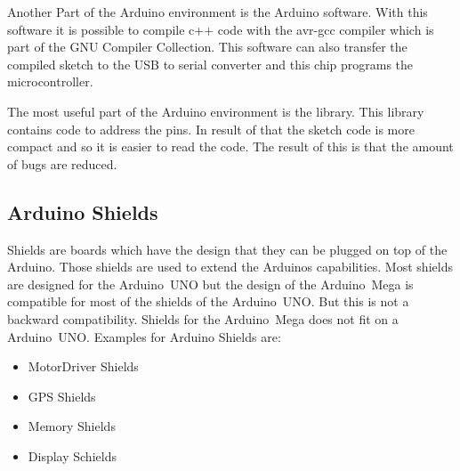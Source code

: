 Another Part of the Arduino environment is the Arduino software.
With this software it is possible to compile c++ code with the avr-gcc compiler which is part of the GNU Compiler Collection.
This software can also transfer the compiled sketch to the USB to serial converter and this chip programs the microcontroller.

The most useful part of the Arduino environment is the library.
This library contains code to address the pins.
In result of that the sketch code is more compact and so it is easier to read the code.
The result of this is that the amount of bugs are reduced.


\subsection{Arduino Shields} \label{sec:arduinoShields}
Shields are boards which have the design that they can be plugged on top of the Arduino.
Those shields are used to extend the Arduinos capabilities.
Most shields are designed for the Arduino~UNO but the design of the Arduino~Mega is compatible for most of the shields of the Arduino~UNO.
But this is not a backward compatibility. Shields for the Arduino~Mega does not fit on a Arduino~UNO.
Examples for Arduino Shields are:
\begin{itemize}
\item MotorDriver Shields
\item GPS Shields
\item Memory Shields
\item Display Schields
\end{itemize}


